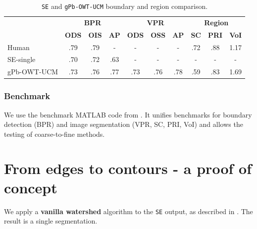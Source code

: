\begin{table}[htbp]
\renewcommand{\arraystretch}{1.3}
\centering
\scriptsize
\begin{tabular}{l|c|c|c||c|c|c||c|c|c|}
\cline{2-10} %
\multirow{2}{*}{} & \multicolumn{3}{c||}{\textbf{BPR}} & \multicolumn{3}{c||}{\textbf{VPR}}& \multicolumn{3}{c|}{\textbf{Region}}\\
\cline{2-10}
& \textbf{ODS}  & \textbf{OIS} & \textbf{AP} %
& \textbf{ODS} & \textbf{OSS} & \textbf{AP} %
& \textbf{SC} & \textbf{PRI} & \textbf{VoI} \\
\hline
\multicolumn{1}{|l|}{Human} & .79 & .79 & - & - & - & - & .72 & .88 & 1.17 \\ %
\hline
\hline
\multicolumn{1}{|l|}{\cite{DollarICCV13edges} SE-single} & .70 & .72 & .63 & - & - & - & - & - & - \\
\hline
\multicolumn{1}{|l|}{\cite{Arbelaez11} gPb-OWT-UCM} & .73 & .76 & .77 & .73 & .76 & .78 & .59 & .83 & 1.69 \\
\hline
\end{tabular}
\caption[{\tt SE} and {\tt gPb-OWT-UCM} boundary and region comparison]{{\tt SE} and {\tt gPb-OWT-UCM} boundary and region comparison.}
\label{tab:SE_vs_gPb_OWT_UCM}
\end{table}

\subsubsection{Benchmark}
We use the benchmark MATLAB code from \cite{Galasso13Benchmark}. %
It unifies benchmarks for boundary detection (BPR) and image segmentation (VPR, SC, %
PRI, VoI) and allows the testing of coarse-to-fine methods. %

\section{From edges to contours - a proof of concept}
\label{sec:ch5-watershed-proof-of-concept}
We apply a {\bf vanilla watershed} algorithm \cite{Beucher1992morphological,Najman1996geodesic,PINKlibrary} to the {\tt SE} output, as described in . The result is a single segmentation. 

